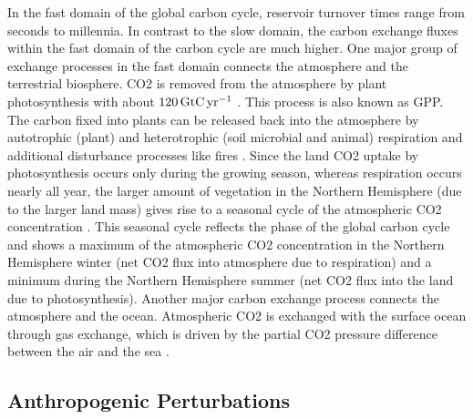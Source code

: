 In the fast domain of the global carbon cycle, reservoir turnover times range
from seconds to millennia. In contrast to the slow domain, the carbon exchange
fluxes within the fast domain of the carbon cycle are much higher. One major
group of exchange processes in the fast domain connects the atmosphere and the
terrestrial biosphere. \ac{CO2} is removed from the atmosphere by plant
photosynthesis with about $120 \unit{\GtCyr{}}$ \autocite{Ciais2013}. This
process is also known as \ac{GPP}. The carbon fixed into plants can be released
back into the atmosphere by autotrophic (plant) and heterotrophic (soil
microbial and animal) respiration and additional disturbance processes like
fires \autocite{Ciais2013}. Since the land \ac{CO2} uptake by photosynthesis
occurs only during the growing season, whereas respiration occurs nearly all
year, the larger amount of vegetation in the Northern Hemisphere (due to the
larger land mass) gives rise to a seasonal cycle of the atmospheric \ac{CO2}
concentration \autocite{Keeling1995}. This seasonal cycle reflects the phase of
the global carbon cycle and shows a maximum of the atmospheric \ac{CO2}
concentration in the Northern Hemisphere winter (net \ac{CO2} flux into
atmosphere due to respiration) and a minimum during the Northern Hemisphere
summer (net \ac{CO2} flux into the land due to photosynthesis). Another major
carbon exchange process connects the atmosphere and the ocean. Atmospheric
\ac{CO2} is exchanged with the surface ocean through gas exchange, which is
driven by the partial \ac{CO2} pressure difference between the air and the sea
\autocite{Ciais2013}.


\subsection{Anthropogenic Perturbations}
\label{subsec:02:carbon_cycle_perturbations}

